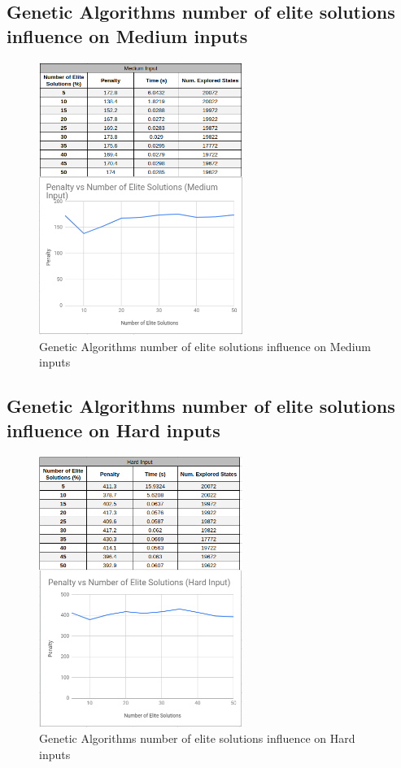 \documentclass[conference]{IEEEtran}
\begin{document}
\subsection{Genetic Algorithms number of elite solutions influence on Medium inputs}

\begin{figure}[H]
    \centerline{\includegraphics[width=250px]{elite_medium.png}}
    \caption{Genetic Algorithms number of elite solutions influence on Medium inputs}
\end{figure}

\subsection{Genetic Algorithms number of elite solutions influence on Hard inputs}

\begin{figure}[H]
    \centerline{\includegraphics[width=250px]{elite_hard.png}}
    \caption{Genetic Algorithms number of elite solutions influence on Hard inputs}
\end{figure}
\end{document}
